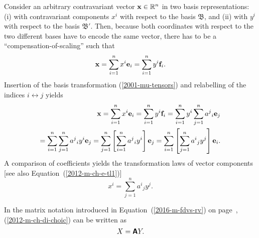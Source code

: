 Consider an arbitrary contravariant vector ${\bf x} \in \mathbb{R}^n$ in two basis representations:
(i)
with contravariant components $x^i$ with respect to the basis
${\mathfrak B}$,
and  (ii) with ${ y }^i$  with respect to the basis
${\mathfrak B'}$.
Then, because both coordinates with respect to the two different bases
have to encode the same vector, there has to be a ``compensation-of-scaling'' such that
\begin{equation}
{\bf x}
=\sum_{i=1}^n x^i {\bf e}_i
=\sum_{i=1}^n { y }^i {\bf f}_i
.
\end{equation}
Insertion of the basis transformation (\ref{2001-mu-tensors}) and
relabelling of the indices $i \leftrightarrow j$ yields
\begin{equation}
\begin{split}
{\bf x}
=\sum_{i=1}^n x^i {\bf e}_i
=\sum_{i=1}^n { y }^i {\bf f}_i
=\sum_{i=1}^n { y }^i \sum_{j=1}^n {a^j}_i {\bf e}_j\\
=
\sum_{i=1}^n\sum_{j=1}^n {a^j}_i { y }^i  {\bf e}_j
=
\sum_{j=1}^n\left[ \sum_{i=1}^n {a^j}_i  { y }^i \right] {\bf e}_j
=
\sum_{i=1}^n\left[ \sum_{j=1}^n {a^i}_j  { y }^j \right] {\bf e}_i
.
\end{split}
\label{2016-m-ch-tensor-tcvc}
\end{equation}
A comparison of coefficients
yields the transformation laws of vector components
[see also Equation~(\ref{2012-m-ch-e-tl1})]
\begin{equation}
x^i   = \sum_{j=1}^n {a^i}_j  { y }^j .
\label{2012-m-ch-di-choic}
\end{equation}

In the matrix notation introduced in Equation~(\ref{2016-m-fdvs-rv}) on page~\pageref{2016-m-fdvs-rv},
(\ref{2012-m-ch-di-choic}) can  be written as
\begin{equation}
X   =  \textsf{\textbf{A}}  Y .
\label{2016-m-ch-di-choic-mn}
\end{equation}



